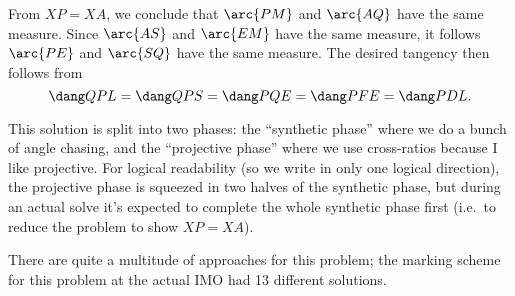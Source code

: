 From $XP = XA$, we conclude that $\arc{PM}$ and $\arc{AQ}$ have the same measure.
Since $\arc{AS}$ and $\arc{EM}$ have the same measure,
it follows $\arc{PE}$ and $\arc{SQ}$ have the same measure.
The desired tangency then follows from
\[ \dang QPL = \dang QPS = \dang PQE = \dang PFE = \dang PDL. \]

\begin{remark*}
  This solution is split into two phases:
  the ``synthetic phase'' where we do a bunch of angle chasing, and the
  ``projective phase'' where we use cross-ratios because I like projective.
  For logical readability (so we write in only one logical direction),
  the projective phase is squeezed in two halves of the synthetic phase,
  but during an actual solve it's expected to complete
  the whole synthetic phase first (i.e.\ to reduce the problem to show $XP=XA$).
\end{remark*}

\begin{remark*}
  There are quite a multitude of approaches for this problem;
  the marking scheme for this problem at the actual IMO had 13 different solutions.
\end{remark*}
\pagebreak